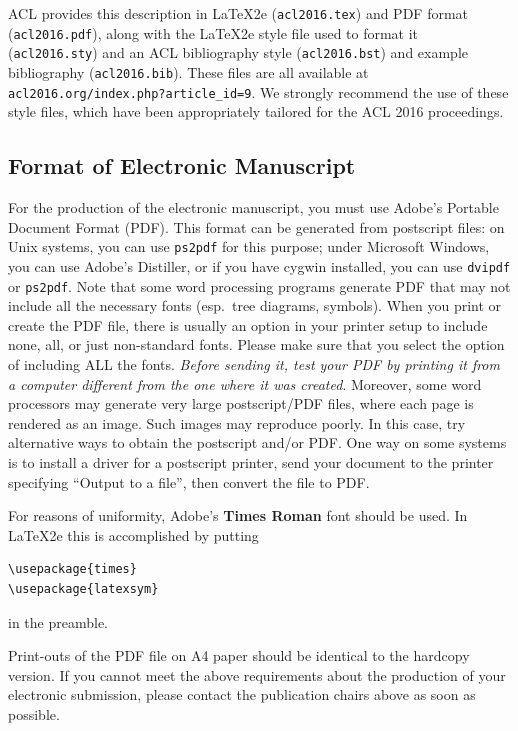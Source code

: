 \documentclass[11pt]{article}
\begin{document}
ACL provides this description in \LaTeX2e{} ({\small\tt acl2016.tex}) and PDF
format ({\small\tt acl2016.pdf}), along with the \LaTeX2e{} style file used to
format it ({\small\tt acl2016.sty}) and an ACL bibliography style ({\small\tt acl2016.bst})
and example bibliography ({\small\tt acl2016.bib}).
These files are all available at
{\small\tt acl2016.org/index.php?article\_id=9}. We
strongly recommend the use of these style files, which have been
appropriately tailored for the ACL 2016 proceedings.

\subsection{Format of Electronic Manuscript}
\label{sect:pdf}

For the production of the electronic manuscript, you must use Adobe's
Portable Document Format (PDF). This format can be generated from
postscript files: on Unix systems, you can use {\small\tt ps2pdf} for this
purpose; under Microsoft Windows, you can use Adobe's Distiller, or
if you have cygwin installed, you can use {\small\tt dvipdf} or
{\small\tt ps2pdf}.  Note 
that some word processing programs generate PDF that may not include
all the necessary fonts (esp.\ tree diagrams, symbols). When you print
or create the PDF file, there is usually an option in your printer
setup to include none, all, or just non-standard fonts.  Please make
sure that you select the option of including ALL the fonts.  {\em
  Before sending it, test your {\/\em PDF} by printing it from a
  computer different from the one where it was created}. Moreover,
some word processors may generate very large postscript/PDF files,
where each page is rendered as an image. Such images may reproduce
poorly.  In this case, try alternative ways to obtain the postscript
and/or PDF.  One way on some systems is to install a driver for a
postscript printer, send your document to the printer specifying
``Output to a file'', then convert the file to PDF.

For reasons of uniformity, Adobe's {\bf Times Roman} font should be
used. In \LaTeX2e{} this is accomplished by putting
\small
\begin{verbatim}
\usepackage{times}
\usepackage{latexsym}
\end{verbatim}
\normalsize
in the preamble.


Print-outs of the PDF file on A4 paper should be identical to the
hardcopy version.  If you cannot meet the above requirements about the
production of your electronic submission, please contact the
publication chairs above  as soon as possible.
\end{document}
